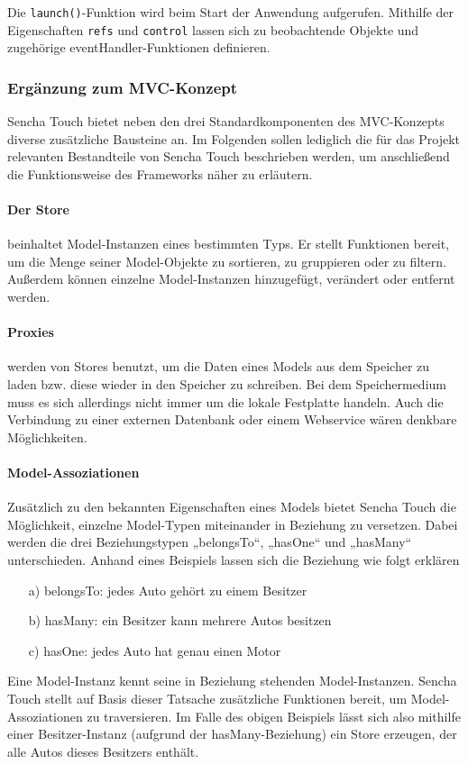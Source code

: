 Die \texttt{launch()}-Funktion wird beim Start der Anwendung aufgerufen. Mithilfe der Eigenschaften \texttt{refs} und \texttt{control} lassen sich zu beobachtende Objekte und zugehörige eventHandler-Funktionen definieren.

\subsubsection*{Ergänzung zum MVC-Konzept}
Sencha Touch bietet neben den drei Standardkomponenten des MVC-Konzepts diverse zusätzliche Bausteine an. Im Folgenden sollen lediglich die für das Projekt relevanten Bestandteile von Sencha Touch beschrieben werden, um anschließend die Funktionsweise des Frameworks näher zu erläutern.

\paragraph{Der Store}\label{sencha-touch:stores} beinhaltet Model-Instanzen eines bestimmten Typs. Er stellt Funktionen bereit, um die Menge seiner Model-Objekte zu sortieren, zu gruppieren oder zu filtern. Außerdem können einzelne Model-Instanzen hinzugefügt, verändert oder entfernt werden.

\paragraph{Proxies }werden von Stores benutzt, um die Daten eines Models aus dem Speicher zu laden bzw. diese wieder in den Speicher zu schreiben. Bei dem Speichermedium muss es sich allerdings nicht immer um die lokale Festplatte handeln. Auch die Verbindung zu einer externen Datenbank oder einem Webservice wären denkbare Möglichkeiten.

\paragraph{Model-Assoziationen}
Zusätzlich zu den bekannten Eigenschaften eines Models bietet Sencha Touch die Möglichkeit, einzelne Model-Typen miteinander in Beziehung zu versetzen. Dabei werden die drei Beziehungstypen „belongsTo“, „hasOne“ und „hasMany“ unterschieden. Anhand eines Beispiels lassen sich die Beziehung wie folgt erklären
\begin{itemize}
	\item[a)] belongsTo: jedes Auto gehört zu einem Besitzer
	\item[b)] hasMany: ein Besitzer kann mehrere Autos besitzen
	\item[c)] hasOne: jedes Auto hat genau einen Motor
\end{itemize}
Eine Model-Instanz kennt seine in Beziehung stehenden Model-Instanzen. Sencha Touch stellt auf Basis dieser Tatsache zusätzliche Funktionen bereit, um Model-Assoziationen zu traversieren. Im Falle des obigen Beispiels lässt sich also mithilfe einer Besitzer-Instanz (aufgrund der hasMany-Beziehung) ein Store erzeugen, der alle Autos dieses Besitzers enthält.


